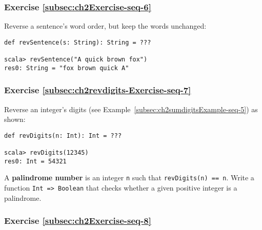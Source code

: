 \subsubsection{Exercise \label{subsec:ch2Exercise-seq-6}\ref{subsec:ch2Exercise-seq-6}}

Reverse a sentence's word order, but keep the words unchanged:
\begin{lstlisting}
def revSentence(s: String): String = ???

scala> revSentence("A quick brown fox")
res0: String = "fox brown quick A"
\end{lstlisting}

\subsubsection{Exercise \label{subsec:ch2revdigits-Exercise-seq-7}\ref{subsec:ch2revdigits-Exercise-seq-7}}

Reverse an integer's digits (see Example~\ref{subsec:ch2sumdigitsExample-seq-5})
as shown:
\begin{lstlisting}
def revDigits(n: Int): Int = ???

scala> revDigits(12345)
res0: Int = 54321
\end{lstlisting}
A \textbf{palindrome number} is an integer
\lstinline!n! such that
\lstinline!revDigits(n) == n!.
Write a function \lstinline!Int => Boolean!
that checks whether a given positive integer is a palindrome.%
\begin{comment}
Solution:\inputencoding{latin9}
\begin{lstlisting}
def digitsOf(n: Int): Seq[Int] = Stream.iterate(n)(_ / 10).takeWhile(_ != 0).map(_ % 10).toList
def revDigits(n: Int): Int = digitsOf(n).foldLeft(0){case (acc, d) => acc*10+d }
def isPalindrome(n: Int): Boolean = revDigits(n) == n
\end{lstlisting}
\inputencoding{utf8}\end{comment}


\subsubsection{Exercise \label{subsec:ch2Exercise-seq-8}\ref{subsec:ch2Exercise-seq-8}}

